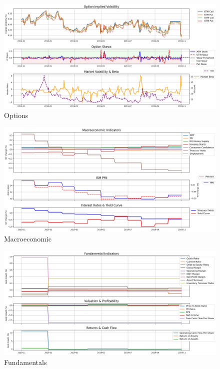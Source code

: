 \documentclass[8pt]{scrartcl}
\begin{document}
\begin{figure}[H]
    \centering
    \includegraphics[width=1\linewidth]{judge_reviews/GOOGL_M_gpt-4o-mini/2019-11-01/judge_Option_Implied_Volatility.png}
    \caption{Options}
\end{figure}

\begin{figure}[H]
    \centering
    \includegraphics[width=1\linewidth]{judge_reviews/GOOGL_M_gpt-4o-mini/2019-11-01/judge_Macroeconomic_Indicators.png}
    \caption{Macroeconomic}
\end{figure}

\begin{figure}[H]
    \centering
    \includegraphics[width=1\linewidth]{judge_reviews/GOOGL_M_gpt-4o-mini/2019-11-01/judge_Fundamental_Indicators.png}
    \caption{Fundamentals}
\end{figure}
\end{document}
